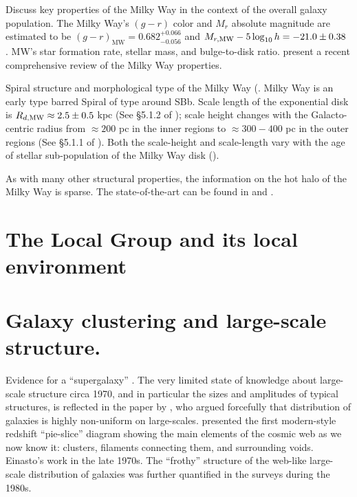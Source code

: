 Discuss key properties of the Milky Way in the context of the overall galaxy population. 
The Milky Way's $(g-r)$ color and $M_r$ absolute magnitude  are estimated to be $(g-r)_{\mathrm{MW}}=0.682^{+0.066}_{-0.056}$ and $M_{r,\rm MW}-5\log_{10}h=-21.0\pm 0.38$ \citet{licquia_etal15}. \citet{licquia_newman15} MW's star formation rate, stellar mass, and bulge-to-disk ratio. present a recent comprehensive review of the Milky Way properties.

Spiral structure and morphological type of the Milky Way (\href{http://adsabs.harvard.edu/abs/2011ARep...55..108E}{\citealt{efremov11}}. Milky Way is an early type barred Spiral 
of type around SBb. Scale length of the exponential disk is $R_{d,\rm MW}\approx 2.5\pm 0.5$ kpc (See \S 5.1.2 of \href{http://adsabs.harvard.edu/abs/2016arXiv160207702B}{\citealt{blandhawthorn_gerhard16}}); scale height changes with the Galacto-centric radius from $\approx 200$ pc in the inner regions to $\approx 300-400$ pc in the outer regions (See \S 5.1.1 of \href{http://adsabs.harvard.edu/abs/2016arXiv160207702B}{\citealt{blandhawthorn_gerhard16}}). Both the scale-height and scale-length vary with the age of stellar sub-population of the Milky Way disk (\href{http://adsabs.harvard.edu/abs/2013ApJ...779..115B}{\citealt{bovy_rix13}}).

As with many other structural properties, the information on the hot halo of the Milky Way is sparse. The state-of-the-art can be found in \href{http://adsabs.harvard.edu/abs/2013ApJ...770..118M}{\citet{miller_bregman13}} and \href{http://adsabs.harvard.edu/abs/2013MNRAS.433.2749G}{\citet{gatto_etal13}}.

\section{The Local Group and its local environment}
\label{sec:lgenv}



\section{Galaxy clustering and large-scale structure.}

Evidence for a ``supergalaxy'' \href{http://adsabs.harvard.edu/abs/1953AJ.....58...30D}{\citet{devaucouleurs53b}}. The very limited state of knowledge about large-scale structure circa 1970, and in particular the sizes and amplitudes of typical structures, is reflected in the paper by \href{http://adsabs.harvard.edu/abs/1970Sci...167.1203D}{\citet{devaucouleurs70}}, who argued forcefully that distribution of galaxies is highly non-uniform on large-scales. \href{http://adsabs.harvard.edu/abs/1978ApJ...222..784G}{\citet{gregory_thompson78}} presented the first modern-style redshift ``pie-slice'' diagram showing the main elements of the cosmic web as we now know it: clusters, filaments connecting them, and surrounding voids. Einasto's work in the late 1970s. The ``frothy'' structure of the web-like large-scale distribution of galaxies was further quantified in the surveys during the 1980s. 

